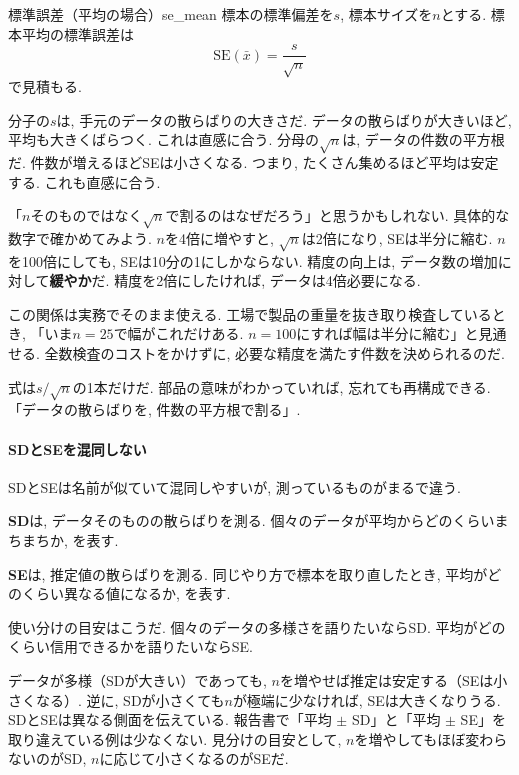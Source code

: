     \begin{defi}{標準誤差（平均の場合）}{se\_mean}
    標本の標準偏差を$s$, 標本サイズを$n$とする.
    標本平均の標準誤差は
    \[
      \mathrm{SE}(\bar{x}) = \frac{s}{\sqrt{n}}
    \]
    で見積もる.
    \end{defi}

    分子の$s$は, 手元のデータの散らばりの大きさだ.
    データの散らばりが大きいほど, 平均も大きくばらつく.
    これは直感に合う.
    分母の$\sqrt{n}$は, データの件数の平方根だ.
    件数が増えるほどSEは小さくなる.
    つまり, たくさん集めるほど平均は安定する.
    これも直感に合う.

    「$n$そのものではなく$\sqrt{n}$で割るのはなぜだろう」と思うかもしれない.
    具体的な数字で確かめてみよう.
    $n$を4倍に増やすと, $\sqrt{n}$は2倍になり, SEは半分に縮む.
    $n$を100倍にしても, SEは10分の1にしかならない.
    精度の向上は, データ数の増加に対して\textbf{緩やか}だ.
    精度を2倍にしたければ, データは4倍必要になる.

    この関係は実務でそのまま使える.
    工場で製品の重量を抜き取り検査しているとき, 「いま$n=25$で幅がこれだけある.
    $n=100$にすれば幅は半分に縮む」と見通せる.
    全数検査のコストをかけずに, 必要な精度を満たす件数を決められるのだ.

    式は$s/\sqrt{n}$の1本だけだ.
    部品の意味がわかっていれば, 忘れても再構成できる.
    「データの散らばりを, 件数の平方根で割る」.

    \paragraph{SDとSEを混同しない}

    SDとSEは名前が似ていて混同しやすいが, 測っているものがまるで違う.

    \textbf{SD}は, データそのものの散らばりを測る.
    個々のデータが平均からどのくらいまちまちか, を表す.

    \textbf{SE}は, 推定値の散らばりを測る.
    同じやり方で標本を取り直したとき, 平均がどのくらい異なる値になるか, を表す.

    使い分けの目安はこうだ.
    個々のデータの多様さを語りたいならSD.
    平均がどのくらい信用できるかを語りたいならSE.

    データが多様（SDが大きい）であっても, $n$を増やせば推定は安定する（SEは小さくなる）.
    逆に, SDが小さくても$n$が極端に少なければ, SEは大きくなりうる.
    SDとSEは異なる側面を伝えている.
    報告書で「平均 $\pm$ SD」と「平均 $\pm$ SE」を取り違えている例は少なくない.
    見分けの目安として, $n$を増やしてもほぼ変わらないのがSD, $n$に応じて小さくなるのがSEだ.

